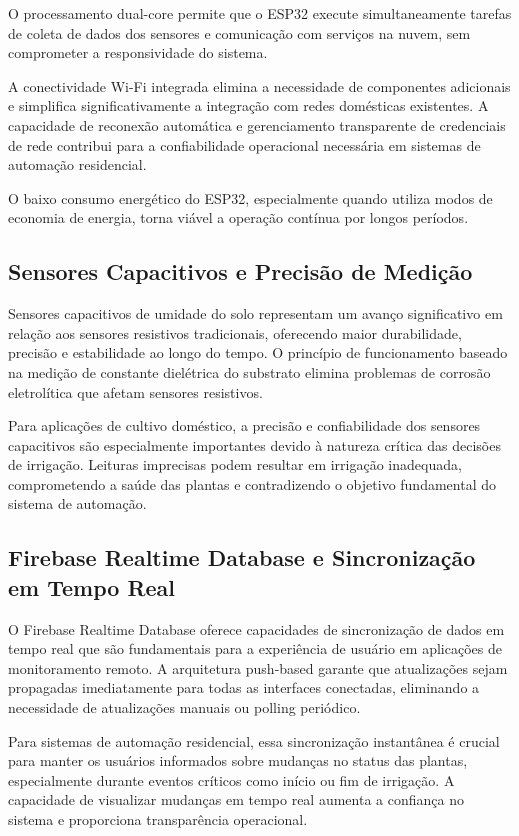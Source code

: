 \documentclass[twoside,english,brazilian]{UNISINOSmonografia}
\begin{document}
O processamento dual-core permite que o ESP32 execute simultaneamente tarefas de coleta de dados dos sensores e comunicação com serviços na nuvem, sem comprometer a responsividade do sistema. 

A conectividade Wi-Fi integrada elimina a necessidade de componentes adicionais e simplifica significativamente a integração com redes domésticas existentes. A capacidade de reconexão automática e gerenciamento transparente de credenciais de rede contribui para a confiabilidade operacional necessária em sistemas de automação residencial.

O baixo consumo energético do ESP32, especialmente quando utiliza modos de economia de energia, torna viável a operação contínua por longos períodos. 

\subsection{Sensores Capacitivos e Precisão de Medição}

Sensores capacitivos de umidade do solo representam um avanço significativo em relação aos sensores resistivos tradicionais, oferecendo maior durabilidade, precisão e estabilidade ao longo do tempo. O princípio de funcionamento baseado na medição de constante dielétrica do substrato elimina problemas de corrosão eletrolítica que afetam sensores resistivos.

Para aplicações de cultivo doméstico, a precisão e confiabilidade dos sensores capacitivos são especialmente importantes devido à natureza crítica das decisões de irrigação. Leituras imprecisas podem resultar em irrigação inadequada, comprometendo a saúde das plantas e contradizendo o objetivo fundamental do sistema de automação.

\subsection{Firebase Realtime Database e Sincronização em Tempo Real}

O Firebase Realtime Database oferece capacidades de sincronização de dados em tempo real que são fundamentais para a experiência de usuário em aplicações de monitoramento remoto. A arquitetura push-based garante que atualizações sejam propagadas imediatamente para todas as interfaces conectadas, eliminando a necessidade de atualizações manuais ou polling periódico.

Para sistemas de automação residencial, essa sincronização instantânea é crucial para manter os usuários informados sobre mudanças no status das plantas, especialmente durante eventos críticos como início ou fim de irrigação. A capacidade de visualizar mudanças em tempo real aumenta a confiança no sistema e proporciona transparência operacional.
\end{document}
